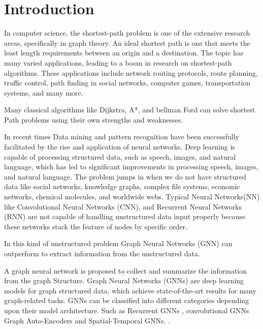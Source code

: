 \documentclass{article}
\begin{document}
\section{Introduction}
In computer science, the shortest-path problem is one of the extensive research areas, speciﬁcally in graph theory. An ideal shortest path is one that meets the least length requirements between an origin and a destination. The topic has many varied applications, leading to a boom in research on shortest-path algorithms. These applications include network routing protocols, route planning, traﬃc control, path ﬁnding in social networks, computer games, transportation systems, and many more. \cite{DBLP:journals/corr/MadkourARRB17}

Many classical algorithms like Dijkstra, A*, and bellman Ford can solve shortest Path problems using their own strengths and weaknesses.

In recent times Data mining and pattern recognition have been successfully facilitated by the rise and application of neural networks. Deep learning is capable of processing structured data, such as speech, images, and natural language, which has led to significant improvements in processing speech, images, and natural language. The problem jumps in when we do not have structured data like social networks, knowledge graphs, complex file systems, economic networks, chemical molecules, and worldwide webs. Typical Neural Networks(NN) like Convolutional Neural Networks (CNN), and Recurrent Neural Networks (RNN) are not capable of handling unstructured data input properly because these networks stack the feature of nodes by specific order. \cite{Mendoza_2019}

In this kind of unstructured problem Graph Neural Networks (GNN) can outperform to extract information from the unstructured data.

A graph neural network is proposed to collect and summarize the information from the graph Structure. \cite{DBLP:journals/corr/abs-1812-04202}
Graph Neural Networks (GNNs)  are deep learning models for graph structured data, which achieve state-of-the-art results for many graph-related tasks.\cite{data7010010}
GNNs can be classified into different categories depending upon their model architecture. \cite{DBLP:journals/corr/abs-1901-00596}
Such as Recurrent GNNs \cite{inproceedings}, convolutional GNNs \cite{DBLP:journals/corr/HamiltonYL17}
\cite{DBLP:journals/corr/KipfW16}
Graph Auto-Encoders \cite{https://doi.org/10.48550/arxiv.1611.07308}
and Spatial-Temporal GNNs. \cite{Yan_Xiong_Lin_2018}.
\printbibliography
\end{document}
